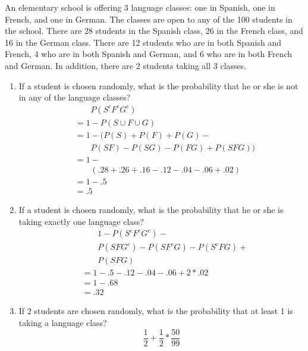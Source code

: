 \item An elementary school is offering 3 language classes: one in Spanish, one in French, and one in German. The classes are open to any of the 100 students in the school. There are 28 students in the Spanish class, 26 in the French class, and 16 in the German class. There are 12 students who are in both Spanish and French, 4 who are in both Spanish and German, and 6 who are in both French and German. In addition, there are 2 students taking all 3 classes.
\begin{enumerate}
    \item If a student is chosen randomly, what is the probability that he or she is not in any of the language classes?
    \begin{align*}
        &\phantom{\;=\;} P(S^cF^cG^c)\\
        &= 1 - P(S\cup F \cup G)\\
        &= 1 - \Big ( P(S) + P(F) + P(G) -\\
        &\phantom{\;=\;} P(SF) - P(SG) - P(FG) + P(SFG) \Big )\\
        &= 
        1 - {}\\
        &\phantom{\;=\;}
        \left ( .28 + .26 + .16 - .12 - .04 - .06 + .02 \right )\\
        &= 1 - .5\\
        &= .5
    \end{align*}
    \item If a student is chosen randomly, what is the probability that he or she is taking exactly one language class?
    \begin{align*}
        &{\phantom{\; = \;}}1 - P(S^cF^cG^c) - {}\\
        &\phantom{\;=\;} P(SFG^c) - P(SF^cG) - P(S^cFG) + {}\\
        &\phantom{\;=\;} P(SFG) \\
        &=1 - .5 - .12 - .04 - .06 + 2 * .02\\
        &=1 - .68\\
        &= .32
    \end{align*}
    \item If 2 students are chosen randomly, what is the probability that at least 1 is taking a language class?
    \[ \frac{1}{2} + \frac{1}{2} * \frac{50}{99} \]
\end{enumerate}